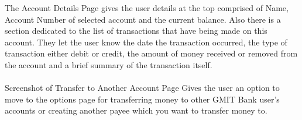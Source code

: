 The Account Details Page gives the user details at the top comprised of Name, Account Number of selected account and the current balance. Also there is a section dedicated to the list of transactions that have being made on this account. They let the user know the date the transaction occurred, the type of transaction either debit or credit, the amount of money received or removed from the account and a brief summary of the transaction itself.\paragraph{}

Screenshot of Transfer to Another Account Page
Gives the user an option to move to the options page for transferring money to other GMIT Bank user’s accounts or creating another payee which you want to transfer money to.\paragraph{}

